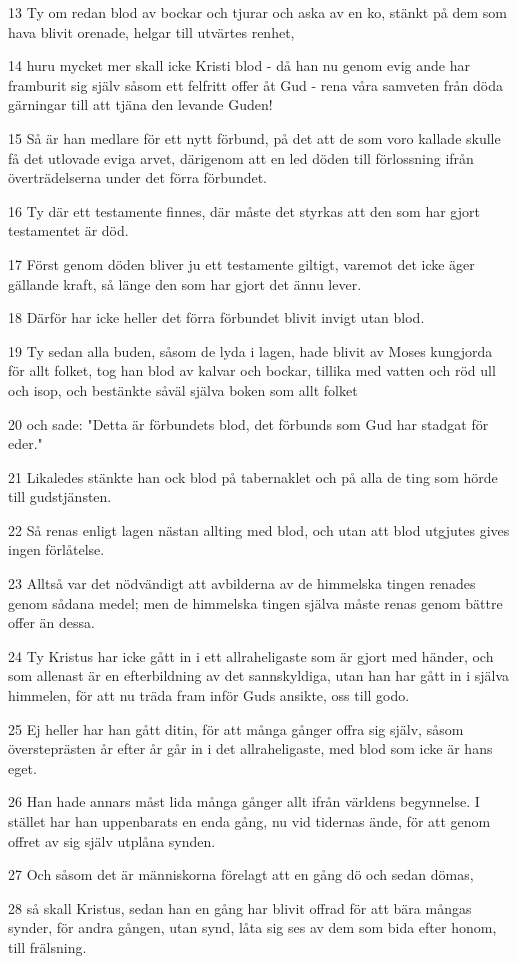 \par 13 Ty om redan blod av bockar och tjurar och aska av en ko, stänkt på dem som hava blivit orenade, helgar till utvärtes renhet,
\par 14 huru mycket mer skall icke Kristi blod - då han nu genom evig ande har framburit sig själv såsom ett felfritt offer åt Gud - rena våra samveten från döda gärningar till att tjäna den levande Guden!
\par 15 Så är han medlare för ett nytt förbund, på det att de som voro kallade skulle få det utlovade eviga arvet, därigenom att en led döden till förlossning ifrån överträdelserna under det förra förbundet.
\par 16 Ty där ett testamente finnes, där måste det styrkas att den som har gjort testamentet är död.
\par 17 Först genom döden bliver ju ett testamente giltigt, varemot det icke äger gällande kraft, så länge den som har gjort det ännu lever.
\par 18 Därför har icke heller det förra förbundet blivit invigt utan blod.
\par 19 Ty sedan alla buden, såsom de lyda i lagen, hade blivit av Moses kungjorda för allt folket, tog han blod av kalvar och bockar, tillika med vatten och röd ull och isop, och bestänkte såväl själva boken som allt folket
\par 20 och sade: "Detta är förbundets blod, det förbunds som Gud har stadgat för eder."
\par 21 Likaledes stänkte han ock blod på tabernaklet och på alla de ting som hörde till gudstjänsten.
\par 22 Så renas enligt lagen nästan allting med blod, och utan att blod utgjutes gives ingen förlåtelse.
\par 23 Alltså var det nödvändigt att avbilderna av de himmelska tingen renades genom sådana medel; men de himmelska tingen själva måste renas genom bättre offer än dessa.
\par 24 Ty Kristus har icke gått in i ett allraheligaste som är gjort med händer, och som allenast är en efterbildning av det sannskyldiga, utan han har gått in i själva himmelen, för att nu träda fram inför Guds ansikte, oss till godo.
\par 25 Ej heller har han gått ditin, för att många gånger offra sig själv, såsom översteprästen år efter år går in i det allraheligaste, med blod som icke är hans eget.
\par 26 Han hade annars måst lida många gånger allt ifrån världens begynnelse. I stället har han uppenbarats en enda gång, nu vid tidernas ände, för att genom offret av sig själv utplåna synden.
\par 27 Och såsom det är människorna förelagt att en gång dö och sedan dömas,
\par 28 så skall Kristus, sedan han en gång har blivit offrad för att bära mångas synder, för andra gången, utan synd, låta sig ses av dem som bida efter honom, till frälsning.

